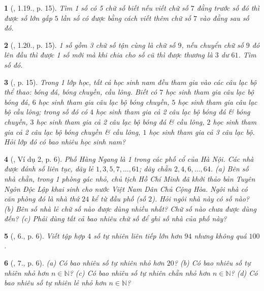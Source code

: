 \documentclass{article}
\newtheorem{baitoan}{}
\begin{document}
\begin{baitoan}[\cite{Binh_boi_duong_Toan_6_tap_1}, 1.19., p. 15]
	Tìm 1 số có 5 chữ số biết nếu viết chữ số $7$ đằng trước số đó thì được số lớn gấp $5$ lần số có được bằng cách viết thêm chữ số $7$ vào đằng sau số đó.
\end{baitoan}

\begin{baitoan}[\cite{Binh_boi_duong_Toan_6_tap_1}, 1.20., p. 15]
	1 số gồm 3 chữ số tận cùng là chữ số $9$, nếu chuyển chữ số $9$ đó lên đầu thì được 1 số mới mà khi chia cho số cũ thì được thương là $3$ dư $61$. Tìm số đó.
\end{baitoan}

\begin{baitoan}[\cite{Binh_boi_duong_Toan_6_tap_1}, p. 15]
	Trong 1 lớp học, tất cả học sinh nam đều tham gia vào các câu lạc bộ thể thao: bóng đá, bóng chuyền, cầu lông. Biết có $7$ học sinh tham gia câu lạc bộ bóng đá, $6$ học sinh tham gia câu lạc bộ bóng chuyền, $5$ học sinh tham gia câu lạc bộ cầu lông; trong số đó có $4$ học sinh tham gia cả 2 câu lạc bộ bóng đá \& bóng chuyền, $3$ học sinh tham gia cả 2 câu lạc bộ bóng đá \& cầu lông, $2$ học sinh tham gia cả 2 câu lạc bộ bóng chuyền \& cầu lông, $1$ học sinh tham gia cả 3 câu lạc bộ. Hỏi lớp đó có bao nhiêu học sinh nam?
\end{baitoan}

\begin{baitoan}[\cite{Tuyen_Toan_6}, Ví dụ 2, p. 6]
	Phố Hàng Ngang là 1 trong các phố cổ của Hà Nội. Các nhà được đánh số liên tục, dãy lẻ $1,3,5,7,\ldots,61$; dãy chẵn $2,4,6,\ldots,64$. (a) Bên số nhà chẵn, trong 1 phòng gác nhỏ, chủ tịch Hồ Chí Minh đã khởi thảo bản Tuyên Ngôn Độc Lập khai sinh cho nước Việt Nam Dân Chủ Cộng Hòa. Ngôi nhà có căn phòng đó là nhà thứ $24$ kể từ đầu phố (số $2$). Hỏi ngôi nhà này có số nào? (b) Bên số nhà lẻ chữ số nào được dùng nhiều nhất? Chữ số nào chưa được dùng đến? (c) Phải dùng tất cả bao nhiêu chữ số để ghi số nhà của phố này?
\end{baitoan}

\begin{baitoan}[\cite{Tuyen_Toan_6}, 6., p. 6]
	Viết tập hợp $4$ số tự nhiên liên tiếp lớn hơn $94$ nhưng không quá $100$.
\end{baitoan}

\begin{baitoan}[\cite{Tuyen_Toan_6}, 7., p. 6]
	(a) Có bao nhiêu số tự nhiên nhỏ hơn $20$? (b) Có bao nhiêu số tự nhiên nhỏ hơn $n\in\mathbb{N}$? (c) Có bao nhiêu số tự nhiên chẵn nhỏ hơn $n\in\mathbb{N}$? (d) Có bao nhiêu số tự nhiên lẻ nhỏ hơn $n\in\mathbb{N}$?
\end{baitoan}
\end{document}
